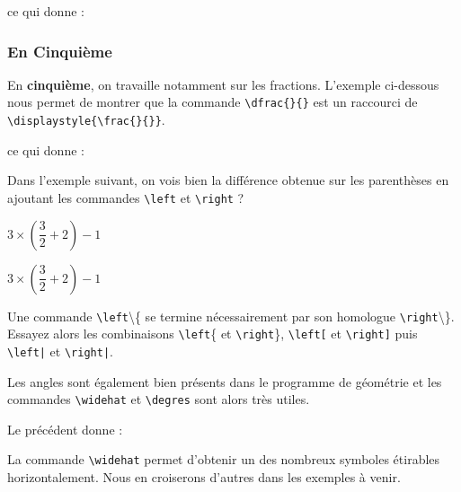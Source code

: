 
ce qui donne :



\subsubsection{En Cinquième}

En \textbf{cinquième}, on travaille notamment sur les fractions. L'exemple ci-dessous nous permet de montrer que la commande \verb!\dfrac{}{}! est un raccourci de \verb!\displaystyle{\frac{}{}}!.


ce qui donne :



Dans l'exemple suivant, on vois bien la différence obtenue sur les parenthèses en ajoutant les commandes \verb!\left! et \verb!\right! ? \bigskip

{
\begin{SideBySideExample}
    $3 \times (\dfrac 3 2 + 2) - 1$ \par\medskip
    $3 \times \left(\dfrac 3 2 + 2\right) - 1$
\end{SideBySideExample}
}
\bigskip

\begin{info}
    Une commande \texttt{\textbackslash left}\textbackslash\{ se termine nécessairement par son homologue \texttt{\textbackslash right}\textbackslash\}. Essayez alors les combinaisons \texttt{\textbackslash left}\{ et \texttt{\textbackslash right}\}, \texttt{\textbackslash left[} et \texttt{\textbackslash right]} puis \texttt{\textbackslash left|} et \texttt{\textbackslash right|}.
\end{info}

Les angles sont également bien présents dans le programme de géométrie et les commandes \texttt{\textbackslash widehat} et \texttt{\textbackslash degres} sont alors très utiles.


Le  précédent donne :



\begin{info}
    La commande \texttt{\textbackslash widehat} permet d'obtenir un des nombreux symboles étirables horizontalement. Nous en croiserons d'autres dans les exemples à venir.
\end{info}


